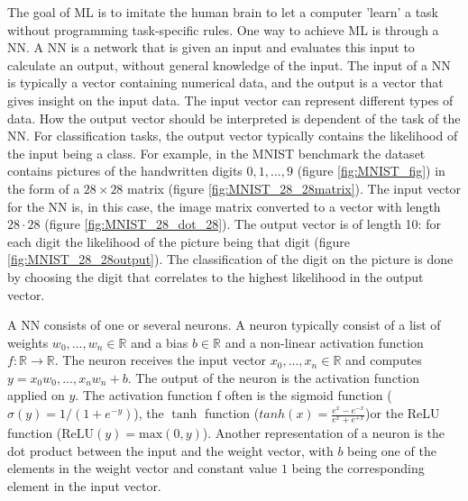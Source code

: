 \documentclass[../thesis.tex]{subfiles}
\begin{document}
The goal of ML is to imitate the human brain to let a computer 'learn' a task without programming task-specific rules. One way to achieve ML is through a NN. A NN is a network that is given an input and evaluates this input to calculate an output, without general knowledge of the input. The input of a NN is typically a vector containing numerical data, and the output is a vector that gives insight on the input data. The input vector can represent different types of data. How the output vector should be interpreted is dependent of the task of the NN. For classification tasks, the output vector typically contains the likelihood of the input being a class. For example, in the MNIST benchmark \parencite{lecun1998} the dataset contains pictures of the handwritten digits $0, 1, ..., 9$ (figure \ref{fig:MNIST_fig}) in the form of a $28 \times 28$ matrix (figure \ref{fig:MNIST_28_28matrix}). The input vector for the NN is, in this case, the image matrix converted to a vector with length $28 \cdot 28$ (figure \ref{fig:MNIST_28_dot_28}). The output vector is of length 10: for each digit the likelihood of the picture being that digit (figure \ref{fig:MNIST_28_28output}). The classification of the digit on the picture is done by choosing the digit that correlates to the highest likelihood in the output vector.

A NN consists of one or several neurons. A neuron typically consist of a list of weights $w_0, ..., w_n \in \mathbb{R}$ and a bias $b \in \mathbb{R}$ and a non-linear activation function $f: \mathbb{R} \to \mathbb{R}$. The neuron receives the input vector $x_0, ..., x_n \in \mathbb{R}$ and computes $y = x_0w_0, ..., x_nw_n + b$. The output of the neuron is the activation function applied on $y$. The activation function f often is the sigmoid function ($\sigma (y) = 1/(1+e^{-y})$), the $\tanh$ function ($tanh(x) = \frac{e^x -e^{-x}}{e^x+e^{+x}}$)or the ReLU function ($\textrm{ReLU}(y) = \textrm{max}(0,y)$). Another representation of a neuron is the dot product between the input and the weight vector, with $b$ being one of the elements in the weight vector and constant value $1$ being the corresponding element in the input vector. 
\end{document}
